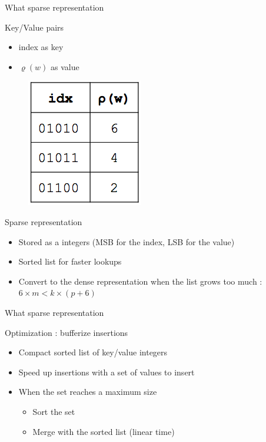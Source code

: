 \documentclass{beamer}
\begin{document}
\begin{frame}{What sparse representation}


\begin{minipage}{0.5\textwidth}%
\begin{block}{Key/Value pairs}
\begin{itemize}
\item index as key
\item $\varrho(w)$ as value
\end{itemize}
\end{block}
\end{minipage}%
\hfill%
\begin{minipage}{0.5\textwidth}%
\begin{figure}[c]
\includegraphics [scale=0.5]  {hyperloglog_list.png}
\end{figure}
\end{minipage}%


\begin{block}{Sparse representation}
\begin{itemize}
\item Stored as a integers (MSB for the index, LSB for the value)
\item Sorted list for faster lookups
\item Convert to the dense representation when the list grows too much : $6\times m < k\times (p + 6)$
\end{itemize}
\end{block}

\end{frame}


\begin{frame}{What sparse representation}


\begin{block}{Optimization : bufferize insertions}
\begin{itemize}
\item Compact sorted list of key/value integers
\item Speed up insertions with a set of values to insert
\item When the set reaches a maximum size
\begin{itemize}
\item Sort the set
\item Merge with the sorted list (linear time)
\end{itemize}
\end{itemize}
\end{block}

\end{frame}
\end{document}
